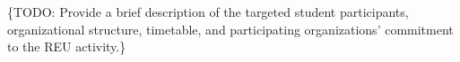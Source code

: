   \{TODO: Provide a brief description of the targeted student participants,
  organizational structure, timetable, and participating organizations'
  commitment to the REU activity.\}

%
